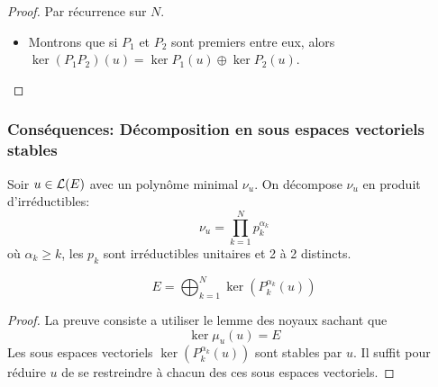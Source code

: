 \begin{proof}
	Par récurrence sur $N$.

	\begin{itemize}
		\item Montrons que si $P_1$ et $P_2$ sont premiers entre eux, alors $\ker (P_1P_2) (u) = \ker P_1(u) \oplus \ker P_2(u)$.\\
	\end{itemize}
\end{proof}


\subsubsection{Conséquences: Décomposition en sous espaces vectoriels stables}


Soir $u \in \mathcal{L}(E)$ avec un polynôme minimal $\nu_u$. On décompose $\nu_u$ en produit
d'irréductibles:
$$ \nu_u = \prod\limits_{k=1}^N p_k^{\alpha_k} $$
où $\alpha_k \geq k$, les $p_k$ sont irréductibles unitaires et 2 à 2 distincts.


\begin{coro}
	$$E = \bigoplus_{k=1}^N \ker\left( {P_k^{\alpha_k}(u)} \right)$$
\end{coro}

\begin{proof}
	La preuve consiste a utiliser le lemme des noyaux sachant que
	$$\ker \mu_u(u) = E $$
    Les sous espaces vectoriels  $\ker\left( {P_k^{\alpha_k}(u)} \right)$ sont stables par $u$.
	Il suffit pour réduire $u$ de se restreindre à chacun des ces sous espaces vectoriels.
\end{proof}

